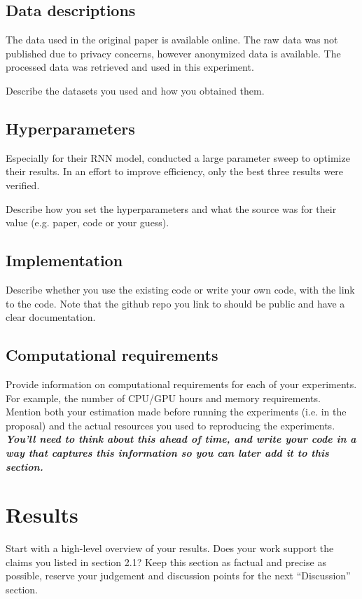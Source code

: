 \documentclass[11pt,a4paper]{article}
\begin{document}
\subsection{Data descriptions}
The data used in the original paper is available online\citep{burger_2021_data}. The raw data was not published due to privacy concerns, however anonymized data is available. The processed data was retrieved and used in this experiment. 

Describe the datasets you used and how you obtained them. 

\subsection{Hyperparameters}
Especially for their RNN model, \citeauthor{burger_2021} conducted a large parameter sweep to optimize their results. In an effort to improve efficiency, only the best three results were verified. 


Describe how you set the hyperparameters and what the source was for their value (e.g. paper, code or your guess). 

\subsection{Implementation}
Describe whether you use the existing code or write your own code, with the link to the code. Note that the github repo you link to should be public and have a clear documentation.

\subsection{Computational requirements}


Provide information on computational requirements for each of your experiments. For example, the number of CPU/GPU hours and memory requirements.
Mention both your estimation made before running the experiments (i.e. in the proposal) and the actual resources you used to reproducing the experiments. 
\textbf{\textit{You'll need to think about this ahead of time, and write your code in a way that captures this information so you can later add it to this section.} }

\section{Results}
Start with a high-level overview of your results. Does your work support the claims you listed in section 2.1? Keep this section as factual and precise as possible, reserve your judgement and discussion points for the next ``Discussion'' section. 
\end{document}
